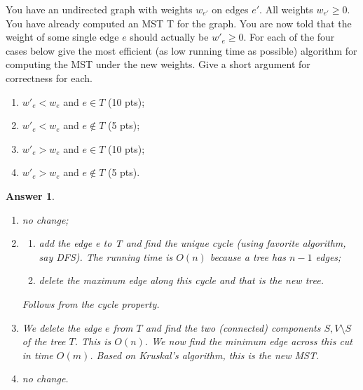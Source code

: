 \documentclass[11pt]{article}
\theoremstyle{numberplain}
\theoremstyle{nonumberplain}
\newtheorem{ans}{Answer}
\newcommand{\0}{{\mathbf{0}}}
\begin{document}
\begin{ques} You have an undirected graph with weights $w_{e'}$ on edges $e'$. All weights $w_{e'}\geq 0$. You have already computed an MST T for the graph. You are now told that the weight of some single edge $e$ should actually be $w'_e\geq 0$. For each of the four cases below give the most efficient (as low running time as possible) algorithm for computing the MST under the new weights. Give a short argument for correctness for each.
\begin{enumerate}
\item $w'_e<w_e$ and $e\in T$ (10 pts);
\item $w'_e<w_e$ and $e\notin T$ (5 pts);
\item $w'_e>w_e$ and $e\in T$ (10 pts);
\item $w'_e>w_e$ and $e\notin T$ (5 pts).
\end{enumerate}
\end{ques}
\begin{ans}
\begin{enumerate}
\item no change;
\item 
\begin{enumerate}
	\item add the edge e to T and find the unique cycle (using favorite algorithm, say
DFS). The running time is $O(n)$ because a tree has $n-1$ edges;
\item delete the maximum edge along this cycle and that is the new tree. 
\end{enumerate}
Follows from the cycle property.
\item We delete the edge $e$ from $T$ and find the two (connected) components $S,V\setminus S$ of the tree $T$. This is $O(n)$. We now find the minimum edge across this cut in time $O(m)$. Based on Kruskal's algorithm, this is the new MST.
\item no change.
\end{enumerate}
\end{ans}
\end{document}

